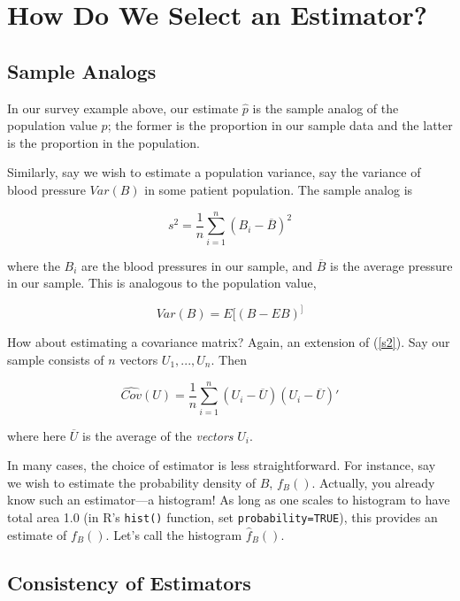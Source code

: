 \section{How Do We Select an Estimator?}

\subsection{Sample Analogs}

In our survey example above, our estimate $\widehat{p}$ is the sample
analog of the population value $p$; the former is the proportion in our
sample data and the latter is the proportion in the population.

Similarly, say we wish to estimate a population variance, say the
variance of blood pressure $Var(B)$ in some patient population.  The
sample analog is

\begin{equation}
\label{s2}
s^2 = \frac{1}{n} \sum_{i=1}^n (B_i - \overline{B})^2
\end{equation}

where the $B_i$ are the blood pressures in our sample, and $\overline{B}$
is the average pressure in our sample.  This is analogous to the
population value,

\begin{equation}
Var(B) = E[(B - EB)^]
\end{equation}

How about estimating a covariance matrix?  Again, an extension of
(\ref{s2}).  Say our sample consists of $n$ vectors
$U_1,...,U_n$.  Then

\begin{equation}
\widehat{Cov}(U) =
\frac{1}{n}
\sum_{i=1}^n (U_i - \overline{U}) (U_i - \overline{U})'
\end{equation}

where here $\overline{U}$ is the average of the \textit{vectors} $U_i$.

In many cases, the choice of estimator is less straightforward.  For
instance, say we wish to estimate the probability density of $B$, 
$f_B()$.  Actually, you already know such an estimator---a histogram!
As long as one scales to histogram to have total area 1.0 (in R's
\lstinline{hist()} function, set \lstinline{probability=TRUE}), this
provides an estimate of $f_B()$.  Let's call the histogram
$\widehat{f}_B()$.

\subsection{Consistency of Estimators}

